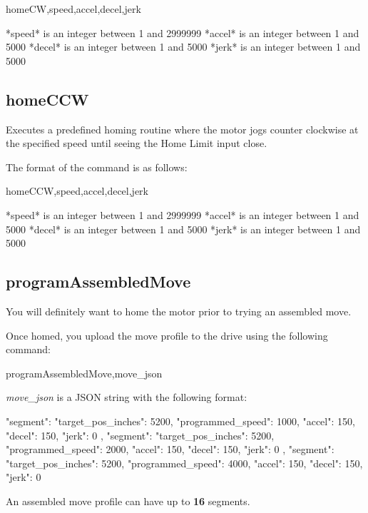 {\ttfamily home\+C\+W,speed,accel,decel,jerk} \begin{DoxyVerb}*speed* is an integer between 1 and 2999999
*accel* is an integer between 1 and 5000
*decel* is an integer between 1 and 5000
*jerk* is an integer between 1 and 5000
\end{DoxyVerb}
\hypertarget{index_homeCCW}{}\subsection{home\+C\+C\+W}\label{index_homeCCW}
Executes a predefined homing routine where the motor jogs counter clockwise at the specified speed until seeing the Home Limit input close.

The format of the command is as follows\+:

{\ttfamily home\+C\+C\+W,speed,accel,decel,jerk} \begin{DoxyVerb}*speed* is an integer between 1 and 2999999
*accel* is an integer between 1 and 5000
*decel* is an integer between 1 and 5000
*jerk* is an integer between 1 and 5000
\end{DoxyVerb}
\hypertarget{index_programAssembledMove}{}\subsection{program\+Assembled\+Move}\label{index_programAssembledMove}
You will definitely want to home the motor prior to trying an assembled move.

Once homed, you upload the move profile to the drive using the following command\+:

{\ttfamily program\+Assembled\+Move,move\+\_\+json}

{\itshape move\+\_\+json} is a J\+S\+O\+N string with the following format\+: \begin{DoxyVerb}{

    "segment": {
        "target_pos_inches": 5200,
        "programmed_speed": 1000,
        "accel": 150,
        "decel": 150,
        "jerk": 0
    },
    "segment": {
        "target_pos_inches": 5200,
        "programmed_speed": 2000,
        "accel": 150,
        "decel": 150,
        "jerk": 0
    },
    "segment": {
        "target_pos_inches": 5200,
        "programmed_speed": 4000,
        "accel": 150,
        "decel": 150,
        "jerk": 0
    }
}
\end{DoxyVerb}


An assembled move profile can have up to {\bfseries 16} segments.

